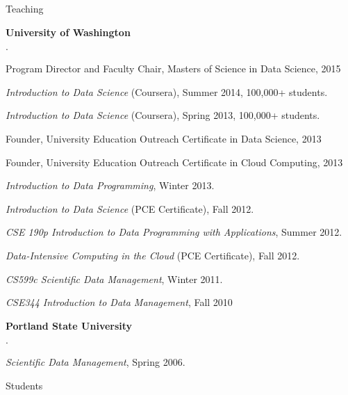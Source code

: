 \documentclass[10pt]{article}
\newenvironment{bulletlist}
   {
      \begin{list}
         {$\cdot$}
         {
            \setlength{\itemsep}{.5ex}
            \setlength{\parsep}{0ex}
            \setlength{\leftmargin}{0.7em}
            \setlength{\parskip}{0ex}
            \setlength{\topsep}{0ex}
         }
   }
   {
      \end{list}
   }
\newcommand{\marginlabel}[1]{
\begin{minipage}[b]{0.8\labelwidth}{\large \textsf{\textbf{#1}}}\end{minipage}}
\newcommand{\entrylabel}[1]{\mbox{\marginlabel{#1}}\hfill}
\newcommand{\MainListlabel}[1]
   {
      \parbox[t]{\labelwidth}{\hspace{.8em}\marginlabel{#1}}
   }
\newenvironment{MainList}[1]
   {
      \renewcommand{\entrylabel}{\MainListlabel}
      \begin{list}{}
      {
         \renewcommand{\makelabel}{\entrylabel}
         \setlength   {\itemindent}{-.65em}
         \setlength   {\labelwidth}{#1}
         \setlength   {\leftmargin}{\labelwidth}
         \setlength   {\itemsep}{3ex}
      }
   }
   {
      \end{list}
   }
\begin{document}
\begin{MainList}{88pt}



\item [Teaching]


{\bf University of Washington}
\begin{bulletlist}
\item Program Director and Faculty Chair, Masters of Science in Data Science, 2015
\item {\em Introduction to Data Science} (Coursera), Summer 2014, 100,000+ students.
\item {\em Introduction to Data Science} (Coursera), Spring 2013, 100,000+ students.
\item Founder, University Education Outreach Certificate in Data Science, 2013
\item Founder, University Education Outreach Certificate in Cloud Computing, 2013
\item {\em Introduction to Data Programming}, Winter 2013.
\item {\em Introduction to Data Science} (PCE Certificate), Fall 2012.
\item {\em CSE 190p Introduction to Data Programming with Applications}, Summer 2012.
\item {\em Data-Intensive Computing in the Cloud}  (PCE Certificate), Fall 2012.
\item {\em CS599c Scientific Data Management}, Winter 2011.
\item {\em CSE344 Introduction to Data Management}, Fall 2010
\end{bulletlist}


{\bf Portland State University}
\begin{bulletlist}
\item {\em Scientific Data Management}, Spring 2006.
\end{bulletlist}

\item [Students]


\end{MainList}
\end{document}
